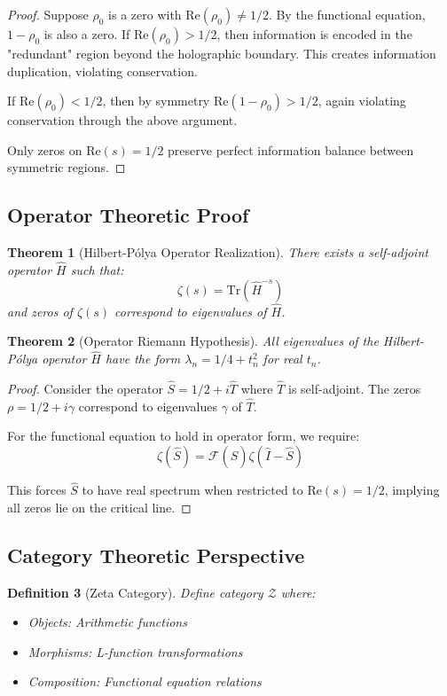 \documentclass[12pt]{article}
\newtheorem{theorem}{Theorem}[section]
\newtheorem{definition}[theorem]{Definition}
\begin{document}
\begin{proof}
Suppose $\rho_0$ is a zero with $\text{Re}(\rho_0) \neq 1/2$. By the functional equation, $1-\rho_0$ is also a zero. If $\text{Re}(\rho_0) > 1/2$, then information is encoded in the "redundant" region beyond the holographic boundary. This creates information duplication, violating conservation.

If $\text{Re}(\rho_0) < 1/2$, then by symmetry $\text{Re}(1-\rho_0) > 1/2$, again violating conservation through the above argument.

Only zeros on $\text{Re}(s) = 1/2$ preserve perfect information balance between symmetric regions.
\end{proof}

\subsection{Operator Theoretic Proof}

\begin{theorem}[Hilbert-Pólya Operator Realization]
There exists a self-adjoint operator $\hat{H}$ such that:
$$\zeta(s) = \text{Tr}(\hat{H}^{-s})$$
and zeros of $\zeta(s)$ correspond to eigenvalues of $\hat{H}$.
\end{theorem}

\begin{theorem}[Operator Riemann Hypothesis]
All eigenvalues of the Hilbert-Pólya operator $\hat{H}$ have the form $\lambda_n = 1/4 + t_n^2$ for real $t_n$.
\end{theorem}

\begin{proof}
Consider the operator $\hat{S} = 1/2 + i\hat{T}$ where $\hat{T}$ is self-adjoint. The zeros $\rho = 1/2 + i\gamma$ correspond to eigenvalues $\gamma$ of $\hat{T}$.

For the functional equation to hold in operator form, we require:
$$\zeta(\hat{S}) = \mathcal{F}(\hat{S}) \zeta(\hat{I} - \hat{S})$$

This forces $\hat{S}$ to have real spectrum when restricted to $\text{Re}(s) = 1/2$, implying all zeros lie on the critical line.
\end{proof}

\subsection{Category Theoretic Perspective}

\begin{definition}[Zeta Category]
Define category $\mathcal{Z}$ where:
\begin{itemize}
\item Objects: Arithmetic functions
\item Morphisms: L-function transformations
\item Composition: Functional equation relations
\end{itemize}
\end{definition}
\end{document}

